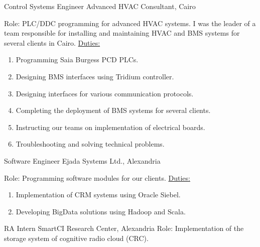 \documentclass[letterpaper]{twentysecondcv} %
\begin{document}
\begin{twenty}
               {Control Systems Engineer}
               {Advanced HVAC Consultant, Cairo}
               {Role: PLC/DDC programming for advanced HVAC systems.
                I was the leader of a team responsible for installing and maintaining HVAC and BMS systems
                for several clients in Cairo.\newline
                \underline{Duties:}
                \begin{enumerate}
                    \item{Programming Saia Burgess PCD PLCs.}
                    \item{Designing BMS interfaces using Tridium controller.}
                    \item{Designing interfaces for various communication protocols.}
                    \item{Completing the deployment of BMS systems for several clients.}
                    \item{Instructing our teams on implementation of electrical boards.}
                    \item{Troubleshooting and solving technical problems.}
                \end{enumerate}
               }

               {Software Engineer}
               {Ejada Systems Ltd., Alexandria}
               {Role: Programming software modules for our clients.\newline
                \underline{Duties:}
                \begin{enumerate}
                    \item Implementation of CRM systems using Oracle Siebel.
                    \item Developing BigData solutions using Hadoop and Scala.
                \end{enumerate}}

               {RA Intern}
               {SmartCI Research Center, Alexandria}
               {Role: Implementation of the storage system of cognitive radio cloud (CRC).}

\end{twenty}

\end{document}
